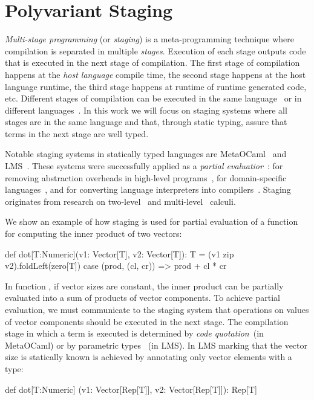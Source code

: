 \chapter{Polyvariant Staging}


\emph{Multi-stage programming} (or \emph{staging}) is a meta-programming technique
  where compilation is separated in multiple \emph{stages}. Execution of each
  stage outputs code that is executed in the next stage of compilation. The first
  stage of compilation happens at the \emph{host language} compile time, the second
  stage happens at the host language runtime, the third stage happens at runtime of
  runtime generated code, etc. Different stages of compilation can be executed in the same
  language~\cite{taha_multi-stage_1997,nielson2005two} or in different languages~\cite{brown_heterogeneous_2011,devito2013terra}.
  In this work we will focus on staging systems where all stages are in the same language and that, through static typing, assure
  that terms in the next stage are well typed.

  Notable staging systems in statically typed languages are
  MetaOCaml~\cite{taha_multi-stage_1997,calcagno2003implementing}
  and LMS~\cite{rompf2012lightweight}. These systems were successfully applied as a
  \emph{partial evaluatior}~\cite{jones1993partial}: for removing abstraction
  overheads in high-level programs~\cite{carette2005multi,rompf2012lightweight},
  for domain-specific languages~\cite{czarnecki_dsl_2004,jonnalagedda2014staged,taha2004gentle}, and for converting language
  interpreters into compilers~\cite{lancet,futamura1999partial}. Staging originates
  from research on two-level~\cite{nielson2005two,davies1996temporal} and multi-level~\cite{davies1996modal} calculi.

 We show an example of how staging is used for partial evaluation of a function
 for computing the inner product of two vectors\footnotemark[1]:\begin{lstparagraph}
def dot[T:Numeric](v1: Vector[T], v2: Vector[T]): T =
  (v1 zip v2).foldLeft(zero[T]) {
    case (prod, (cl, cr)) => prod + cl * cr
  }
 \end{lstparagraph}

In function , if vector sizes are constant, the inner product can
 be partially evaluated into a sum of products of vector components. To achieve partial evaluation,
 we must communicate to the staging system that operations on values of vector components
 should be executed in the next stage. The compilation stage
 in which a term is executed is determined by \emph{code quotation}~(in MetaOCaml)
 or by parametric types ~(in LMS). In LMS marking
 that the vector size is statically known is achieved by annotating only vector elements with
 a  type\footnotemark[2]:\begin{lstparagraph}
def dot[T:Numeric]
  (v1: Vector[Rep[T]], v2: Vector[Rep[T]]): Rep[T]
 \end{lstparagraph}


